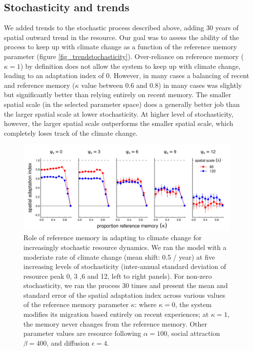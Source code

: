 \documentclass[12pt]{article}
\begin{document}
\subsection{Stochasticity and trends}

We added trends to the stochastic process described above, adding 30 years of spatial outward trend in the resource. Our goal was to assess the ability of the process to keep up with climate change as a function of the reference memory parameter (figure \ref{fig_trendstochasticity}). Over-reliance on reference memory ($\kappa = 1$) by definition does not allow the system to keep up with climate change, leading to an adaptation index of 0. However, in many cases a balancing of recent and reference memory ($\kappa$ value between 0.6 and 0.8) in many cases was slightly but significantly better than relying entirely on recent memory. The smaller spatial scale (in the selected parameter space) does a generally better job than the larger spatial scale at lower stochasticity. At higher level of stochasticity, however, the larger spatial scale outperforms the smaller spatial scale, which completely loses track of the climate change.

\begin{figure}

\includegraphics[width=\textwidth]{figures/TrendStochasticity.png}

\caption{ \label{fig_trendstochastity} Role of reference memory in adapting to climate change for increasingly stochastic resource dynamics. We ran the model with a moderiate rate of climate change (mean shift: 0.5 / year) at five increasing levels of stochasticity (inter-annual standard deviation of resource peak 0, 3 ,6 and 12, left to right panels). For non-zero stochasticity, we ran the process 30 times and present the mean and standard error of the spatial adaptation index across various values of the reference memory parameter $\kappa$: where $\kappa = 0$, the system modifies its migration based entirely on recent experiences; at $\kappa = 1$, the memory never changes from the reference memory. Other parameter values are resource following $\alpha = 100$, social attraction $\beta = 400$, and diffusion $\epsilon = 4$.}

\end{figure}
\end{document}
